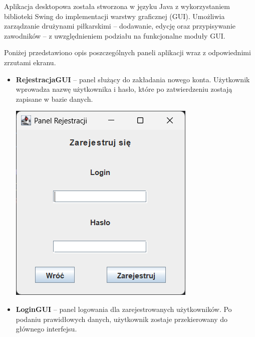 \documentclass{urdpl}     %
\begin{document}
Aplikacja desktopowa została stworzona w języku Java z wykorzystaniem biblioteki Swing do implementacji warstwy graficznej (GUI). Umożliwia zarządzanie drużynami piłkarskimi – dodawanie, edycję oraz przypisywanie zawodników – z uwzględnieniem podziału na funkcjonalne moduły GUI.

Poniżej przedstawiono opis poszczególnych paneli aplikacji wraz z odpowiednimi zrzutami ekranu.

\begin{itemize}
  \item
  \begin{minipage}[t]{\linewidth}
    \textbf{RejestracjaGUI} -- panel służący do zakładania nowego konta. Użytkownik wprowadza nazwę użytkownika i hasło, które po zatwierdzeniu zostają zapisane w bazie danych.

    \vspace{0.3em}
    \begin{center}
      \includegraphics[width=0.7\linewidth]{rejestracja.png}
      \label{fig:rejestracja}
    \end{center}
  \end{minipage}

  \item
  \begin{minipage}[t]{\linewidth}
    \textbf{LoginGUI} -- panel logowania dla zarejestrowanych użytkowników. Po podaniu prawidłowych danych, użytkownik zostaje przekierowany do głównego interfejsu.


\end{minipage}
\end{itemize}
\end{document}
